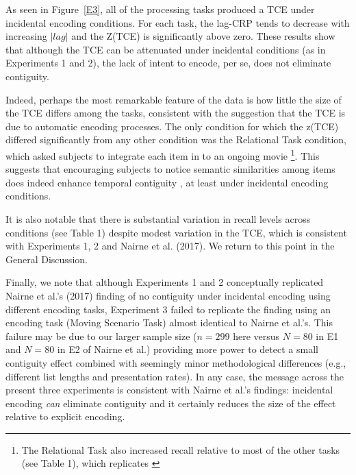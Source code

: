 \documentclass[jou,natbib,floatsintext]{apa6} %
\begin{document}
As seen in Figure~\ref{E3}, all of the processing tasks produced a TCE under incidental encoding conditions. For each task, the lag-CRP tends to decrease with increasing $|lag|$ and the Z(TCE) is significantly above zero. These results show that although the TCE can be attenuated under incidental conditions (as in Experiments 1 and 2), the lack of intent to encode, per se, does not eliminate contiguity. 

Indeed, perhaps the most remarkable feature of the data is how little the size of the TCE differs among the tasks, consistent with the suggestion that the TCE is due to automatic encoding processes. The only condition for which the z(TCE) differed significantly from any other condition was the Relational Task condition, which asked subjects to integrate each item in to an ongoing movie \footnote{The Relational Task also increased recall relative to most of the other tasks (see Table 1), which replicates \citet{BowClar69}}. This suggests that encouraging subjects to notice semantic similarities among items does indeed enhance temporal contiguity \citep{Hint16}, at least under incidental encoding conditions. 

It is also notable that there is substantial variation in recall levels across conditions (see Table 1) despite modest variation in the TCE, which is consistent with Experiments 1, 2 and Nairne et al. (2017). We return to this point in the General Discussion.

Finally, we note that although Experiments 1 and 2 conceptually replicated Nairne et al.'s (2017) finding of no contiguity under incidental encoding using different encoding tasks, Experiment 3 failed to replicate the finding using an encoding task (Moving Scenario Task) almost identical to Nairne et al.'s. This failure may be due to our larger sample size ($n=299$ here versus $N=80$ in E1 and $N=80$ in E2 of Nairne et al.) providing more power to detect a small contiguity effect combined with seemingly minor methodological differences (e.g., different list lengths and presentation rates). In any case, the message across the present three experiments is consistent with Nairne et al.'s findings: incidental encoding \emph{can} eliminate contiguity and it certainly reduces the size of the effect relative to explicit encoding. 
\end{document}
